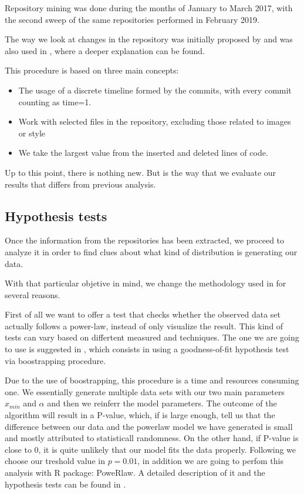\documentclass[conference]{IEEEtran}
\begin{document}
Repository mining was done during the months of January to March
2017, with the second sweep of the same repositories performed in
February 2019.

The way we look at changes in the repository was initially proposed by \cite{Merelo2016:repomining} and was also used in
\cite{merelo2017self}, where a deeper explanation can be found.

This procedure is based on three main concepts:
\begin{itemize}
	\item The usage of a discrete timeline formed by the
	commits, with every commit counting as time=1. 
	\item Work with selected files in the repository, excluding 
	those related to images or style
	\item We take the largest value from the inserted and deleted lines of code.
\end{itemize}

Up to this point, there is nothing new. But is the way that we evaluate our results that differs from previous analysis.

\subsection{Hypothesis tests}

Once the information from the repositories has been extracted, we
proceed to analyze it in order to find clues about what kind of distribution is generating our data. 

With that particular objetive in mind, we change the methodology used
in \cite{merelo2017self} for several reasons.

First of all we want to offer a test that checks whether the observed data 
set actually follows a power-law, instead of only visualize the result. 
This kind of tests can vary based on differtent measured and techniques. The one we
are going to use is suggested in \cite{clauset2009power}, which consists in using a
goodness-of-fit hypothesis test via boostrapping procedure. 

Due to the use of boostrapping, this procedure is a time and resources consuming one.
We essentially  generate  multiple  data  sets  with our two main parameters $x_{min}$ 
and $\alpha$  and  then  we reinferr the model parameters. The outcome of the algorithm 
will result in a P-value, which, if is large enough, tell us that the difference
between our data and the powerlaw model we have generated is small and mostly attributed
to statisticall randomness. On the other hand, if P-value is close to 0, it is quite unlikely
that our model fits the data properly.
Following \cite{clauset2009power} we choose our treshold value in $p=0.01$, in addition
we are going to perfom this analysis with R package: PoweRlaw. A detailed description
of it and the hypothesis tests can be found in \cite{gillespie2015power}.
\end{document}
